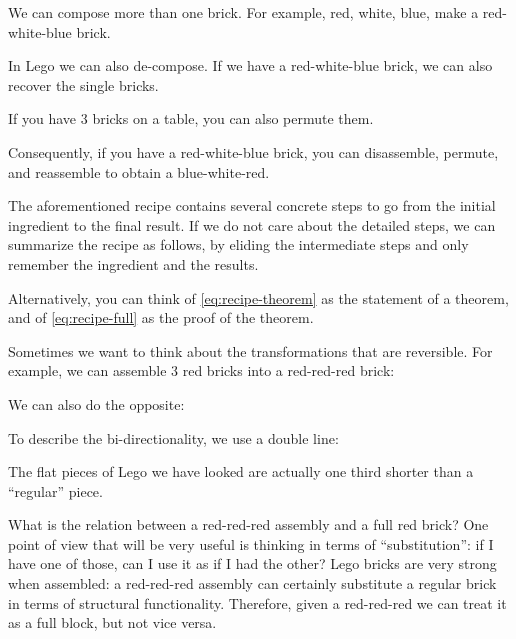 We can compose more than one brick.
For example, red, white, blue, make a red-white-blue brick.


In Lego we can also de-compose. If we have a red-white-blue brick, we can also recover
the single bricks.


If you have 3 bricks on a table, you can also permute them.


Consequently, if you have a red-white-blue brick, you can disassemble, permute, and reassemble to obtain a blue-white-red.




The aforementioned recipe contains several concrete steps to go from the initial ingredient to the final result.
If we do not care about the detailed steps, we can summarize the recipe as follows, by eliding the intermediate steps and only remember the ingredient and the results.


Alternatively, you can think of \cref{eq:recipe-theorem} as the statement of a theorem, and of \cref{eq:recipe-full} as the proof of the theorem.

Sometimes we want to think about the transformations that are reversible.
For example, we can assemble 3 red bricks into a red-red-red brick:


We can also do the opposite:



To describe the bi-directionality, we use a double line:



The flat pieces of Lego we have looked are actually one third shorter than a ``regular'' piece.



What is the relation between a red-red-red assembly and a full red brick?
One point of view that will be very useful is thinking in terms of ``substitution'': if I have one of those, can I use it as if I had the other?
Lego bricks are very strong when assembled: a red-red-red assembly can certainly substitute
a regular brick in terms of structural functionality.
Therefore, given a red-red-red we can treat it as a full block, but not vice versa.

